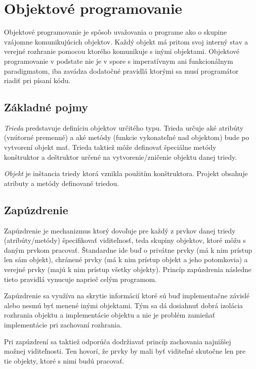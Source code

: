 \documentclass[a4paper,10pt]{article}
\begin{document}
\section{Objektové programovanie}

\begin{multicols}{2}

	Objektové programovanie je spôsob uvažovania o programe ako o skupine vzájomne komunikujúcich objektov. Každý objekt má pritom svoj interný stav a verejné rozhranie pomocou ktorého komunikuje s inými objektami. Objektové programovanie v podstate nie je v spore s imperatívnym ani funkcionálnym paradigmatom, iba zavádza dodatočné pravidlá ktorými sa musí programátor riadiť pri písaní kódu.
	
	\subsection{Základné pojmy}
	
		\emph{Trieda} predstavuje definíciu objektov určitého typu. Trieda určuje aké atribúty (vnútorné premenné) a aké metódy (funkcie vykonateľné nad objektom) bude po vytvorení objekt mať. Trieda taktiež môže definovať špeciálne metódy konštruktor a deštruktor určené na vytvorenie/zničenie objektu danej triedy.
		
		\emph{Objekt} je inštancia triedy ktorá vznikla použitím konštruktora. Projekt obsahuje atributy a metódy definované triedou.
		
	\subsection{Zapúzdrenie}
	
		Zapúzdrenie je mechanizmus ktorý dovoľuje pre každý z prvkov danej triedy (atribúty/metódy) špecifikovať viditeľnosť, teda skupiny objektov, ktoré môžu s daným prvkom pracovať. Štandardne ide buď o privátne prvky (má k nim prístup len sám objekt), chránené prvky (má k nim prístup objekt a jeho potomkovia) a verejné prvky (majú k nim prístup všetky objekty). Princíp zapúzdrenia následne tieto pravidlá vynucuje naprieč celým programom.
		
		Zapúzdrenie sa využíva na skrytie informácií ktoré sú buď implementačne závislé alebo nesmú byť menené inými objektami. Tým sa dá dosiahnuť dobrá izolácia rozhrania objektu a implementácie objektu a nie je problém zamieňať implementácie pri zachovaní rozhrania.
		
		Pri zapúzdrení sa taktiež odporúča dodržiavať princíp zachovania najnižšej možnej viditeľnosti. Ten hovorí, že prvky by mali byť viditeľné skutočne len pre tie objekty, ktoré s nimi budú pracovať. 
		

\end{multicols}
\end{document}
